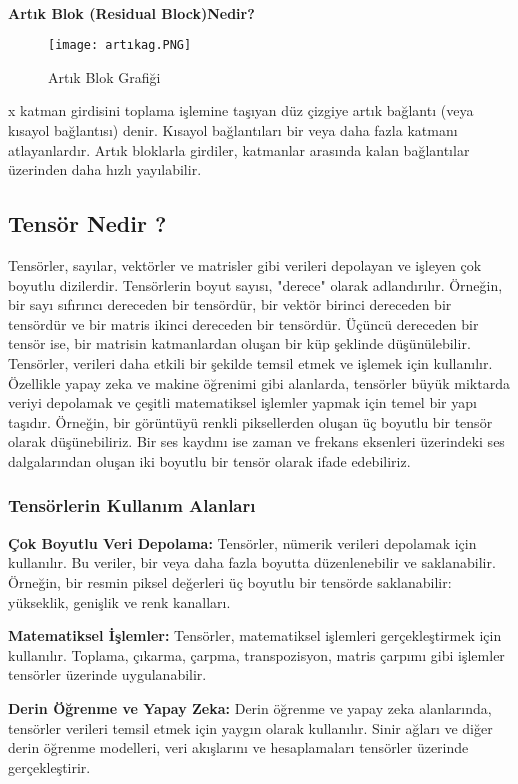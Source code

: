 \documentclass[12pt]{article}
\begin{document}
\\
\textbf{Artık Blok (Residual Block)Nedir?}
\begin{figure}[h]
    \centering
    \texttt{[image: artıkag.PNG]}
    \caption{Artık Blok Grafiği}
    \label{fig:enter-label}
\end{figure}\newline
x katman girdisini toplama işlemine taşıyan düz çizgiye artık bağlantı (veya kısayol bağlantısı) denir. Kısayol bağlantıları bir veya daha fazla katmanı atlayanlardır. Artık bloklarla girdiler, katmanlar arasında kalan bağlantılar üzerinden daha hızlı yayılabilir.\cite{cilek2021resnet}


\subsection{Tensör Nedir ?}
Tensörler, sayılar, vektörler ve matrisler gibi verileri depolayan ve işleyen çok boyutlu dizilerdir. Tensörlerin boyut sayısı, "derece" olarak adlandırılır. Örneğin, bir sayı sıfırıncı dereceden bir tensördür, bir vektör birinci dereceden bir tensördür ve bir matris ikinci dereceden bir tensördür. Üçüncü dereceden bir tensör ise, bir matrisin katmanlardan oluşan bir küp şeklinde düşünülebilir.
Tensörler, verileri daha etkili bir şekilde temsil etmek ve işlemek için kullanılır. Özellikle yapay zeka ve makine öğrenimi gibi alanlarda, tensörler büyük miktarda veriyi depolamak ve çeşitli matematiksel işlemler yapmak için temel bir yapı taşıdır. Örneğin, bir görüntüyü renkli piksellerden oluşan üç boyutlu bir tensör olarak düşünebiliriz. Bir ses kaydını ise zaman ve frekans eksenleri üzerindeki ses dalgalarından oluşan iki boyutlu bir tensör olarak ifade edebiliriz.
\subsubsection{Tensörlerin Kullanım Alanları}
\textbf{Çok Boyutlu Veri Depolama:} Tensörler, nümerik verileri depolamak için kullanılır. Bu veriler, bir veya daha fazla boyutta düzenlenebilir ve saklanabilir. Örneğin, bir resmin piksel değerleri üç boyutlu bir tensörde saklanabilir: yükseklik, genişlik ve renk kanalları.

\textbf{Matematiksel İşlemler:} Tensörler, matematiksel işlemleri gerçekleştirmek için kullanılır. Toplama, çıkarma, çarpma, transpozisyon, matris çarpımı gibi işlemler tensörler üzerinde uygulanabilir.

\textbf{Derin Öğrenme ve Yapay Zeka:} Derin öğrenme ve yapay zeka alanlarında, tensörler verileri temsil etmek için yaygın olarak kullanılır. Sinir ağları ve diğer derin öğrenme modelleri, veri akışlarını ve hesaplamaları tensörler üzerinde gerçekleştirir.
\end{document}
